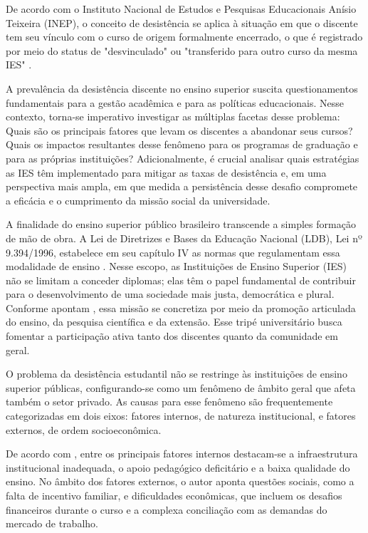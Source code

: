De acordo com o Instituto Nacional de Estudos e Pesquisas Educacionais Anísio Teixeira (INEP), o conceito de desistência se aplica à situação em que o discente tem seu vínculo com o curso de origem formalmente encerrado, o que é registrado por meio do status de "desvinculado" ou "transferido para outro curso da mesma IES" \cite{inep2017}.

A prevalência da desistência discente no ensino superior suscita questionamentos fundamentais para a gestão acadêmica e para as políticas educacionais. Nesse contexto, torna-se imperativo investigar as múltiplas facetas desse problema: Quais são os principais fatores que levam os discentes a abandonar seus cursos? Quais os impactos resultantes desse fenômeno para os programas de graduação e para as próprias instituições? Adicionalmente, é crucial analisar quais estratégias as IES têm implementado para mitigar as taxas de desistência e, em uma perspectiva mais ampla, em que medida a persistência desse desafio compromete a eficácia e o cumprimento da missão social da universidade.

A finalidade do ensino superior público brasileiro transcende a simples formação de mão de obra. A Lei de Diretrizes e Bases da Educação Nacional (LDB), Lei nº 9.394/1996, estabelece em seu capítulo IV as normas que regulamentam essa modalidade de ensino \cite{brasil1996}. Nesse escopo, as Instituições de Ensino Superior (IES) não se limitam a conceder diplomas; elas têm o papel fundamental de contribuir para o desenvolvimento de uma sociedade mais justa, democrática e plural. Conforme apontam , essa missão se concretiza por meio da promoção articulada do ensino, da pesquisa científica e da extensão. Esse tripé universitário busca fomentar a participação ativa tanto dos discentes quanto da comunidade em geral.

O problema da desistência estudantil não se restringe às instituições de ensino superior públicas, configurando-se como um fenômeno de âmbito geral que afeta também o setor privado. As causas para esse fenômeno são frequentemente categorizadas em dois eixos: fatores internos, de natureza institucional, e fatores externos, de ordem socioeconômica.

De acordo com , entre os principais fatores internos destacam-se a infraestrutura institucional inadequada, o apoio pedagógico deficitário e a baixa qualidade do ensino. No âmbito dos fatores externos, o autor aponta questões sociais, como a falta de incentivo familiar, e dificuldades econômicas, que incluem os desafios financeiros durante o curso e a complexa conciliação com as demandas do mercado de trabalho.

